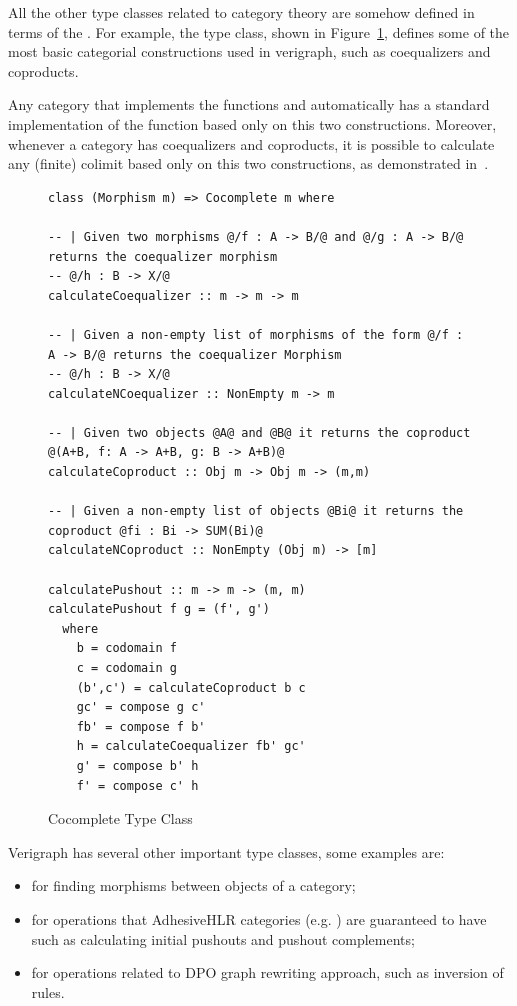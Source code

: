 All the other type classes related to category theory are somehow defined in terms of the . For example, the  type class, shown in Figure~\ref{fig:verigraph:cocomplete-type-class}, defines some of the most basic categorial constructions used in verigraph, such as coequalizers and coproducts.

Any category that implements the functions  and  automatically has a standard implementation of the  function based only on this two constructions. Moreover, whenever a category has coequalizers and coproducts, it is possible to calculate any (finite) colimit based only on this two constructions, as demonstrated in~\cite{Pierce1991}.

\begin{figure}[!ht]
  \begin{verbatim}
class (Morphism m) => Cocomplete m where

-- | Given two morphisms @/f : A -> B/@ and @/g : A -> B/@ returns the coequalizer morphism
-- @/h : B -> X/@
calculateCoequalizer :: m -> m -> m

-- | Given a non-empty list of morphisms of the form @/f : A -> B/@ returns the coequalizer Morphism
-- @/h : B -> X/@
calculateNCoequalizer :: NonEmpty m -> m

-- | Given two objects @A@ and @B@ it returns the coproduct @(A+B, f: A -> A+B, g: B -> A+B)@
calculateCoproduct :: Obj m -> Obj m -> (m,m)

-- | Given a non-empty list of objects @Bi@ it returns the coproduct @fi : Bi -> SUM(Bi)@
calculateNCoproduct :: NonEmpty (Obj m) -> [m]

calculatePushout :: m -> m -> (m, m)
calculatePushout f g = (f', g')
  where
    b = codomain f
    c = codomain g
    (b',c') = calculateCoproduct b c
    gc' = compose g c'
    fb' = compose f b'
    h = calculateCoequalizer fb' gc'
    g' = compose b' h
    f' = compose c' h
\end{verbatim}
\caption{Cocomplete Type Class}\label{fig:verigraph:cocomplete-type-class}
\end{figure}

Verigraph has several other important type classes, some examples are:
\begin{itemize}
  \item {} for finding morphisms between objects of a category;
  \item {} for operations that AdhesiveHLR categories (e.g. ) are guaranteed to have such as calculating initial pushouts and pushout complements;
  \item {} for operations related to DPO graph rewriting approach, such as inversion of rules.
\end{itemize}

